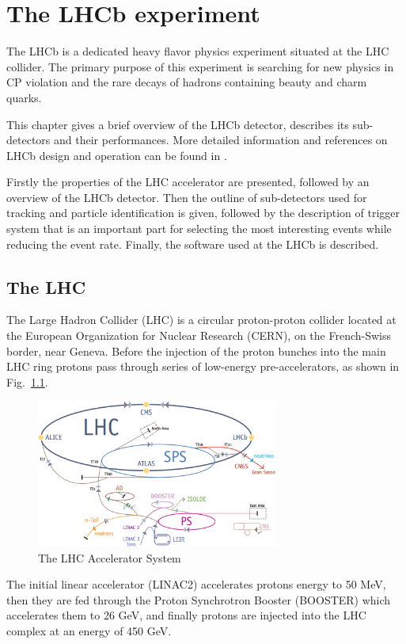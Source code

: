 \chapter{The LHCb experiment}
\label{ch_lhcb}

The LHCb is a dedicated heavy flavor physics experiment situated at the LHC
collider.
The primary purpose of this experiment is searching for new physics in CP
violation and the rare decays of hadrons containing beauty and charm quarks.

This chapter gives a brief overview of the LHCb detector, describes its
sub-detectors and their performances. More detailed information and references
on LHCb design and operation can be found in \cite{Alves:2008zz}.

Firstly the properties of the LHC accelerator are presented, followed by an
overview of the LHCb detector. Then the outline of sub-detectors used for
tracking and particle identification is given, followed by the description of
trigger system that is an important part for selecting the most interesting
events while reducing the event rate. Finally, the software used at the LHCb
is described.

\section{The LHC}
\label{ch_lhcb:lhc}

The Large Hadron Collider (LHC) is a circular proton-proton collider  located
at the European Organization for Nuclear Research (CERN), on the French-Swiss
border, near Geneva. Before the injection of the proton bunches into the main
LHC ring protons pass through series of low-energy pre-accelerators, as shown
in Fig.~\ref{fig:lhc}.

\begin{figure}[tb]
\centering
\includegraphics[width=300px]{figs/lhc.png}
\caption{\small The LHC Accelerator System}
\label{fig:lhc}
\end{figure}

The initial linear accelerator (LINAC2) accelerates protons energy to 50 MeV,
then they are fed through the Proton Synchrotron Booster (BOOSTER) which
accelerates them to 26 GeV, and finally protons are injected  into the LHC
complex at an energy of 450 GeV.

